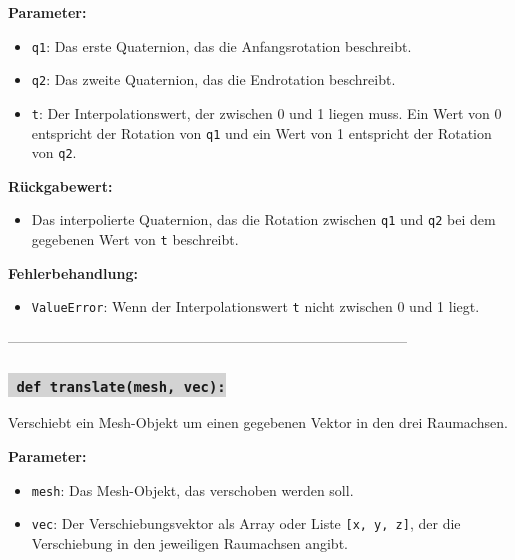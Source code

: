 \noindent \textbf{Parameter:} \vspace{-6ex} \\
\begin{itemize}
    \setlength{\itemindent}{1em}
    \item \texttt{q1}: Das erste Quaternion, das die Anfangsrotation beschreibt.
    \item \texttt{q2}: Das zweite Quaternion, das die Endrotation beschreibt.
    \item \texttt{t}: Der Interpolationswert, der zwischen 0 und 1 liegen muss. Ein Wert von 0 entspricht der Rotation von \texttt{q1} und ein Wert von 1 entspricht der Rotation von \texttt{q2}.
\end{itemize}

\noindent \textbf{Rückgabewert:} \vspace{-6ex} \\
\begin{itemize}
    \setlength{\itemindent}{1em}
    \item Das interpolierte Quaternion, das die Rotation zwischen \texttt{q1} und \texttt{q2} bei dem gegebenen Wert von \texttt{t} beschreibt.
\end{itemize}

\noindent \textbf{Fehlerbehandlung:} \vspace{-6ex} \\
\begin{itemize}
    \setlength{\itemindent}{1em}
    \item \texttt{ValueError}: Wenn der Interpolationswert \texttt{t} nicht zwischen 0 und 1 liegt.
\end{itemize}

--------------------------------------------------------------------------------------



\subsubsection*{\colorbox{lightgray}{\texttt{\textbf{\color{green} def} \color{blue} translate}\textbf{\texttt{(mesh, vec):}}}}
Verschiebt ein Mesh-Objekt um einen gegebenen Vektor in den drei Raumachsen.

\noindent \textbf{Parameter:} \vspace{-6ex} \\
\begin{itemize}
    \setlength{\itemindent}{1em}
    \item \texttt{mesh}: Das Mesh-Objekt, das verschoben werden soll.
    \item \texttt{vec}: Der Verschiebungsvektor als Array oder Liste \texttt{[x, y, z]}, der die Verschiebung in den jeweiligen Raumachsen angibt.
\end{itemize}


